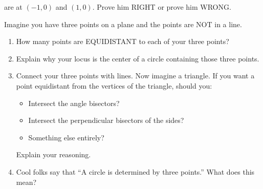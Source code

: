 \documentclass[nooutcomes,noauthor,handout]{ximera}
\begin{document}
\begin{question}
\begin{enumerate}
\begin{center}
      \end{center}
      are at $(-1,0)$ and $(1,0)$. Prove him RIGHT or prove him WRONG.
  \end{enumerate}
\end{question}
\mynewpage


\begin{question}
  Imagine you have three points on a plane and the points are NOT in a
  line.
  \begin{enumerate}
  \item How many points are EQUIDISTANT to each of your three points?
  \item Explain why your locus is the center of a circle containing those three points.
  \item Connect your three points with lines. Now imagine a
    triangle. If you want a point equidistant from the vertices of the
    triangle, should you:
    \begin{itemize}
    \item Intersect the angle bisectors?
    \item Intersect the perpendicular bisectors of the sides?
    \item Something else entirely?
    \end{itemize}
    Explain your reasoning.
  \item Cool folks say that ``A circle is determined by three points.'' What does this mean?
  \end{enumerate}
\end{question}
\end{document}
